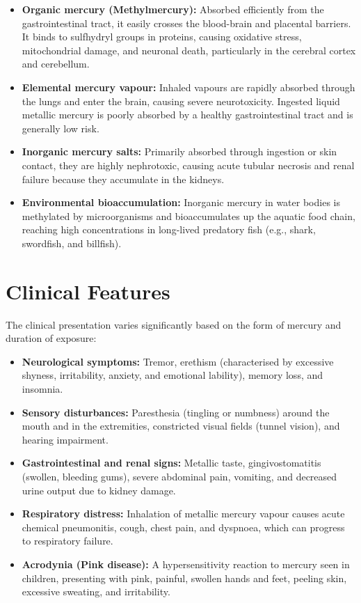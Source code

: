 \begin{itemize}
    \item \textbf{Organic mercury (Methylmercury):} Absorbed efficiently from the gastrointestinal tract, it easily crosses the blood-brain and placental barriers. It binds to sulfhydryl groups in proteins, causing oxidative stress, mitochondrial damage, and neuronal death, particularly in the cerebral cortex and cerebellum.
    \item \textbf{Elemental mercury vapour:} Inhaled vapours are rapidly absorbed through the lungs and enter the brain, causing severe neurotoxicity. Ingested liquid metallic mercury is poorly absorbed by a healthy gastrointestinal tract and is generally low risk.
    \item \textbf{Inorganic mercury salts:} Primarily absorbed through ingestion or skin contact, they are highly nephrotoxic, causing acute tubular necrosis and renal failure because they accumulate in the kidneys.
    \item \textbf{Environmental bioaccumulation:} Inorganic mercury in water bodies is methylated by microorganisms and bioaccumulates up the aquatic food chain, reaching high concentrations in long-lived predatory fish (e.g., shark, swordfish, and billfish).
\end{itemize}

\section*{Clinical Features}
The clinical presentation varies significantly based on the form of mercury and duration of exposure:

\begin{itemize}
    \item \textbf{Neurological symptoms:} Tremor, erethism (characterised by excessive shyness, irritability, anxiety, and emotional lability), memory loss, and insomnia.
    \item \textbf{Sensory disturbances:} Paresthesia (tingling or numbness) around the mouth and in the extremities, constricted visual fields (tunnel vision), and hearing impairment.
    \item \textbf{Gastrointestinal and renal signs:} Metallic taste, gingivostomatitis (swollen, bleeding gums), severe abdominal pain, vomiting, and decreased urine output due to kidney damage.
    \item \textbf{Respiratory distress:} Inhalation of metallic mercury vapour causes acute chemical pneumonitis, cough, chest pain, and dyspnoea, which can progress to respiratory failure.
    \item \textbf{Acrodynia (Pink disease):} A hypersensitivity reaction to mercury seen in children, presenting with pink, painful, swollen hands and feet, peeling skin, excessive sweating, and irritability.
\end{itemize}

